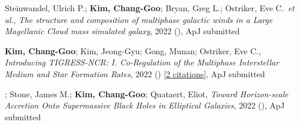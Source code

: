 \item Steinwandel, Ulrich P.; \textbf{Kim, Chang-Goo}; Bryan, Greg L.; Ostriker, Eve C.~\textit{et al.}, \textit{The structure and composition of multiphase galactic winds in a Large Magellanic Cloud mass simulated galaxy}, 2022 (), ApJ submitted

\item \textbf{Kim, Chang-Goo}; Kim, Jeong-Gyu; Gong, Munan; Ostriker, Eve C., \textit{Introducing TIGRESS-NCR: I. Co-Regulation of the Multiphase Interstellar Medium and Star Formation Rates}, 2022 () [\href{http://adsabs.harvard.edu/abs/2022arXiv221113293K}{2 citations}], ApJ submitted

\item {}; Stone, James M.; \textbf{Kim, Chang-Goo}; Quataert, Eliot, \textit{Toward Horizon-scale Accretion Onto Supermassive Black Holes in Elliptical Galaxies}, 2022 (), ApJ submitted